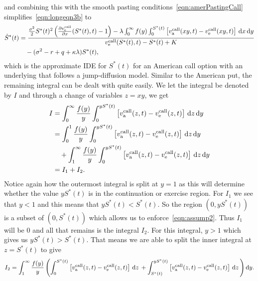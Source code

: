 		 and combining this with the smooth pasting conditions~\eqref{eqn:amerPastingCall} simplifies~\eqref{eqn:longeqn3b} to
			\begin{equation}
				\label{eqn:longeqn4}
				\begin{split}
				\dot{S}^*(t) &= \frac{\frac{\sigma^2}{2}S^*(t)^2\left( \frac{\partial  v_{\text{e}}^{\text{call}} }{\partial x}(S^*(t),t) - 1\right) - \lambda\int_0^\infty f(y) \int_0^{S^*(t)} \left[ v_{\text{a}}^{\text{call}}(xy,t) -  v_{\text{e}}^{\text{call}}(xy,t) \right] \, \mathrm d x \, \mathrm d y}{ v_{\text{e}}^{\text{call}}(S^*(t),t) - S^*(t) + K} \\
				&\quad{} - (\sigma^2 - r + q +\kappa\lambda)S^*(t),
				\end{split}
			\end{equation}
which is the approximate IDE for $S^*(t)$ for an American call option with an underlying that follows a jump-diffusion model. Similar to the American put, the remaining integral can be dealt with quite easily. We let the integral be denoted by $I$ and through a change of variables $z = xy$, we get
	\begin{align*}
				I &= \int_0^\infty \frac{f(y)}{y}\int_0^{yS^*(t)} \left[ v_{\text{a}}^{\text{call}}(z,t) -  v_{\text{e}}^{\text{call}}(z,t) \right] \, \mathrm d z\, \mathrm d y \\
				&= \int_0^1 \frac{f(y)}{y} \int_0^{yS^*(t)} \left[ v_{\text{a}}^{\text{call}}(z,t) -  v_{\text{e}}^{\text{call}}(z,t) \right] \, \mathrm d z\, \mathrm d y \\
				&{} \quad + \int_1^\infty\frac{f(y)}{y} \int_0^{yS^*(t)} \left[ v_{\text{a}}^{\text{call}}(z,t) -  v_{\text{e}}^{\text{call}}(z,t) \right] \, \mathrm d z\, \mathrm d y \\
				&= I_1 + I_2.
			\end{align*}
Notice again how the outermost integral is split at $y=1$ as this will determine whether the value $yS^*(t)$ is in the continuation or exercise region. For $I_1$ we see that $y < 1$ and this means that $yS^*(t) < S^*(t)$. So the region $(0, yS^*(t))$ is a subset of $(0,S^*(t))$ which allows us to enforce~\eqref{eqn:assump2}. Thus $I_1$ will be 0 and all that remains is the integral $I_2$. For this integral, $y > 1$ which gives us $yS^*(t) > S^*(t)$. That means we are able to split the inner integral at $z = S^*(t)$ to give
	$$
		I_2 =  \int_1^\infty\frac{f(y)}{y} \left( \int_0^{S^*(t)} \left[ v_{\text{a}}^{\text{call}}(z,t) -  v_{\text{e}}^{\text{call}}(z,t) \right] \, \mathrm d z\, + \int_{S^*(t)}^{yS^*(t)} \left[ v_{\text{a}}^{\text{call}}(z,t) -  v_{\text{e}}^{\text{call}}(z,t) \right] \, \mathrm d z\, \right) \mathrm d y.
	$$
